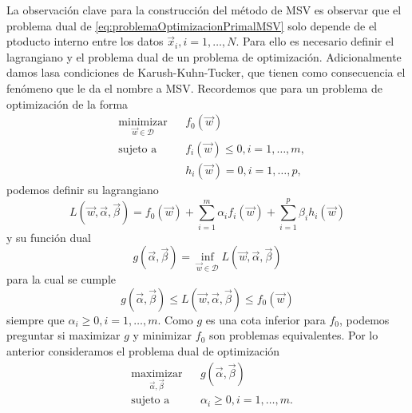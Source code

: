 \documentclass[letterpaper,12pt]{book}
\begin{document}
La observación clave para la construcción del método de MSV es observar que el problema dual de \ref{eq:problemaOptimizacionPrimalMSV} solo depende de el ptoducto interno entre los datos $\vec{x}_i, i = 1,\dots,N$. Para ello es necesario definir el lagrangiano y el problema dual de un problema de optimización. Adicionalmente damos lasa condiciones de Karush-Kuhn-Tucker, que tienen como consecuencia el fenómeno que le da el nombre a MSV. Recordemos que para un  problema de optimización de la forma 
\begin{equation}\label{eq:problemaDeOptimizacionGeneral}
  \begin{aligned}
    & \underset{\vec{w}\in\mathcal{D}}{\text{minimizar}}
    & & f_0(\vec{w})\\
    & \text{sujeto a}
    & & f_i(\vec{w}) \leq 0 , i = 1,\dots,m,\\
    & & & h_i(\vec{w}) = 0, i = 1, \dots, p,
  \end{aligned}
\end{equation}
podemos definir su lagrangiano 
\begin{equation}
  L(\vec{w}, \vec{\alpha}, \vec{\beta}) = f_0(\vec{w}) + \sum_{i=1}^{m}\alpha_if_i(\vec{w}) + \sum_{i=1}^{p}\beta_ih_i(\vec{w})
\end{equation}
y su función dual 
\begin{equation}
  g(\vec{\alpha}, \vec{\beta}) = \inf_{\vec{w}\in\mathcal{D}}L(\vec{w}, \vec{\alpha}, \vec{\beta})
\end{equation}
para la cual se cumple
\begin{equation}
  g(\vec{\alpha}, \vec{\beta}) \leq L(\vec{w}, \vec{\alpha}, \vec{\beta}) \leq f_0(\vec{w})
\end{equation}
siempre que $\alpha_i\geq 0, i = 1,\dots, m$. Como $g$ es una cota inferior para $f_0$, podemos preguntar si maximizar $g$ y minimizar $f_0$ son problemas equivalentes. Por lo anterior consideramos el problema dual de optimización
\begin{equation}\label{eq:problemaOptimizacionDualGeneral}
  \begin{aligned}
    & \underset{\vec{\alpha},\vec{\beta}}{\text{maximizar}}
    & & g(\vec{\alpha}, \vec{\beta})\\
    & \text{sujeto a}
    & & \alpha_i \geq 0 , i = 1,\dots,m.
  \end{aligned}
\end{equation}
\end{document}
